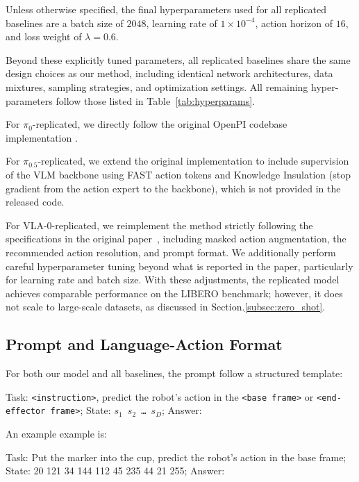 Unless otherwise specified, the final hyperparameters used for all replicated baselines are a batch size of $2048$, learning rate of $1\times10^{-4}$, action horizon of $16$, and loss weight of $\lambda=0.6$.

Beyond these explicitly tuned parameters, all replicated baselines share the same design choices as our method, including identical network architectures, data mixtures, sampling strategies, and optimization settings. 
All remaining hyper-parameters follow those listed in Table~\ref{tab:hyperparams}.

For $\pi_{0}$-replicated, we directly follow the original OpenPI codebase implementation \cite{black2024pi0visionlanguageactionflowmodel}. 

For $\pi_{0.5}$-replicated, we extend the original implementation to include supervision of the VLM backbone using FAST action tokens and Knowledge Insulation \cite{driess2025knowledgeinsulatingvisionlanguageactionmodels} (stop gradient from the action expert to the backbone), which is not provided in the released code. 

For VLA-0-replicated, we reimplement the method strictly following the specifications in the original paper~\cite{goyal2025vla0buildingstateoftheartvlas}, including masked action augmentation, the recommended action resolution, and prompt format. We additionally perform careful hyperparameter tuning beyond what is reported in the paper, particularly for learning rate and batch size. With these adjustments, the replicated model achieves comparable performance on the LIBERO benchmark; however, it does not scale to large-scale datasets, as discussed in Section.\ref{subsec:zero_shot}.

\subsection{Prompt and Language-Action Format}
For both our model and all baselines, the prompt follow a structured template:

\begin{tcolorbox}[promptbox]
Task: \texttt{<instruction>}, predict the robot's action in the \texttt{<base frame>} or \texttt{<end-effector frame>}; State: \texttt{$s_1$\ $s_2$\ \ldots\ $s_D$}; Answer:
\end{tcolorbox}

An example example is:

\begin{tcolorbox}[promptbox]
Task: Put the marker into the cup, predict the robot's action in the base frame; State: 20 121 34 144 112 45 235 44 21 255; Answer:
\end{tcolorbox}

